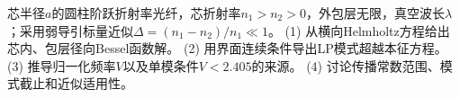 芯半径\(a\)的圆柱阶跃折射率光纤，芯折射率\(n_1>n_2>0\)，外包层无限，真空波长\(\lambda\)；采用弱导引标量近似\(\Delta=(n_1-n_2)/n_1\ll1\)。
(1) 从横向Helmholtz方程给出芯内、包层径向Bessel函数解。
(2) 用界面连续条件导出LP模式超越本征方程。
(3) 推导归一化频率\(V\)以及单模条件\(V<2.405\)的来源。
(4) 讨论传播常数范围、模式截止和近似适用性。
